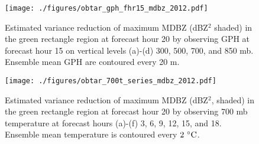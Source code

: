 \documentclass{ttuthes2007}
\begin{document}
\begin{figure}[!tb]
  \centering
  \noindent\texttt{[image: ./figures/obtar\_gph\_fhr15\_mdbz\_2012.pdf]}\\
  \caption{Estimated variance reduction of maximum MDBZ (dBZ${}^2$ shaded) in the green rectangle region at forecast hour 20 by observing GPH at forecast hour 15 on vertical levels (a)-(d) 300, 500, 700, and 850 mb. Ensemble mean GPH are contoured every 20 m.}
\label{obtar_gph_fhr15_mdbz_2012}
\end{figure}

\begin{figure}[!tb]
  \centering
  \noindent\texttt{[image: ./figures/obtar\_700t\_series\_mdbz\_2012.pdf]}\\
  \caption{Estimated variance reduction of maximum MDBZ (dBZ${}^2$, shaded) in the green rectangle region at forecast hour 20 by observing 700 mb temperature at forecast hours (a)-(f) 3, 6, 9, 12, 15, and 18. Ensemble mean temperature is contoured every $2^{~\circ} {\rm C}$.}
\label{obtar_700t_series_mdbz_2012}
\end{figure}
\end{document}
